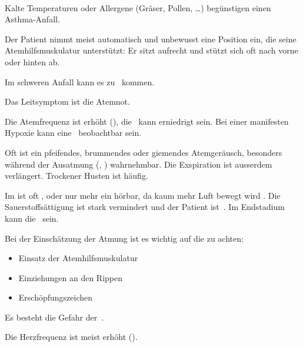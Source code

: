 \documentclass[
ngerman,
paper=a4,
asymmetric,
fontsize=10pt,
draft=false,
numbers=noenddot,
bibtotocnumbered,
footnotes=multiple,
]{scrreprt}
\newcommand{\jNEU}{\vspace{6pt}\noindent{\color{green}\sffamily\textbf{ADDED}\hrulefill\newline}}
\newcommand{\jNEUende}{\newline{\color{green}\rule{\linewidth}{3pt}\newline}}
\newcommand{\RedFlag}{{\color{DefaultRed}\scriptsize{\VarFlag}\hspace{-0.5em}}}
\begin{document}
 {\TxABCDE}
 {~
 \begin{ABCDEText}
   \item[\ABCDE{1}] Kalte Temperaturen oder Allergene
   (Gräser, Pollen, \ldots) begünstigen einen Asthma-Anfall.
   \item[\ABCDE{2}] Der Patient nimmt meist automatisch und unbewusst eine
   Position ein, die seine Atemhilfsmuskulatur unterstützt: Er
   sitzt aufrecht und stützt sich oft nach vorne oder hinten
   ab.
   \item[\ABCDE{3}] Im schweren Anfall kann es zu
   {\RedFlag}\, kommen.
   \item[\ABCDE{4}] Das Leitsymptom ist die Atemnot.
   \item[\ABCDE{B}] Die Atemfrequenz ist erhöht
   (), die {\RedFlag}\,
   kann erniedrigt sein. Bei einer manifesten Hypoxie kann eine
   {\RedFlag}\, beobachtbar sein.
   
   Oft ist ein pfeifendes,
   brummendes oder giemendes Atemgeräusch, besonders während
   der Ausatmung (, ) wahrnehmbar. Die Exspiration ist ausserdem
   verlängert. Trockener Husten ist häufig.
   
   Im  ist oft , oder nur mehr ein
    hörbar, da kaum mehr Luft bewegt
   wird . Die
   {\RedFlag}\,Sauerstoffsättigung ist stark vermindert und der
   Patient ist {\RedFlag}\,. Im Endstadium kann
  die {\RedFlag}\, sein. 
  
  \jNEU
  Bei der Einschätzung der Atmung ist es wichtig auf die
   zu
  achten:
  \begin{itemize}
    \item Einsatz der Atemhilfsmuskulatur
    \item Einziehungen an den Rippen
    \item Erschöpfungszeichen
  \end{itemize}
  Es besteht die Gefahr der {\RedFlag}\,.
  \jNEUende
   \item[\ABCDE{C}] Die Herzfrequenz ist meist erhöht
   ().
  \item[\ABCDE{=}] 
 \end{ABCDEText}
 }
\end{document}
